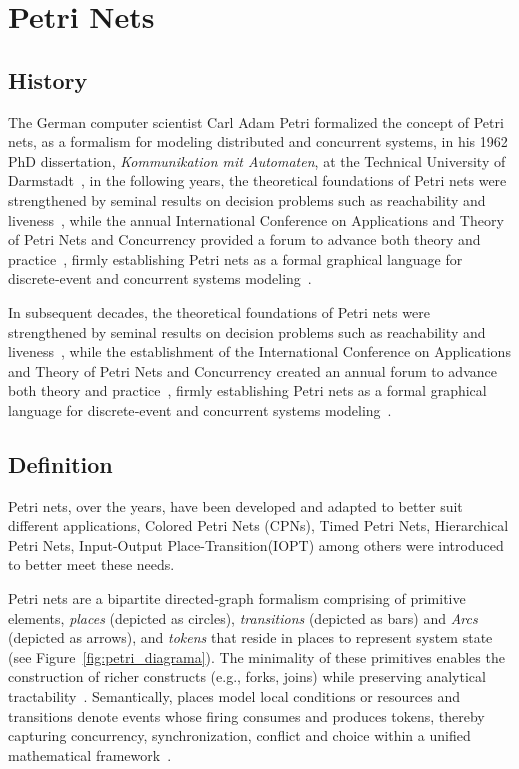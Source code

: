 \section{Petri Nets}
\label{sec:petri_nets}


\subsection{History}
\label{subsec:history}
The German computer scientist Carl Adam Petri formalized the concept of  Petri nets, as a formalism for modeling distributed and concurrent systems, in his 1962 PhD dissertation, \emph{Kommunikation mit Automaten}, at the Technical University of Darmstadt~\cite{adamCarlPetri}, in the following years, the theoretical foundations of Petri nets were strengthened by seminal results on decision problems such as reachability and liveness~\cite{murata}, while the annual International Conference on Applications and Theory of Petri Nets and Concurrency provided a forum to advance both theory and practice~\cite{ICPN1980}, firmly establishing Petri nets as a formal graphical language for discrete‐event and concurrent systems modeling~\cite{WikiPetriNet2025}.


In subsequent decades, the theoretical foundations of Petri nets were strengthened by seminal results on decision problems such as reachability and liveness~\cite{murata}, while the establishment of the International Conference on Applications and Theory of Petri Nets and Concurrency created an annual forum to advance both theory and practice~\cite{ICPN1980}, firmly establishing Petri nets as a formal graphical language for discrete‐event and concurrent systems modeling~\cite{WikiPetriNet2025}.

\subsection{Definition}
\label{subsec:definition}


Petri nets, over the years, have been developed and adapted to better suit different applications,  Colored Petri Nets (CPNs), Timed Petri Nets, Hierarchical Petri Nets, Input-Output Place-Transition(IOPT) among others were introduced to better meet these needs. 

Petri nets are a bipartite directed‐graph formalism comprising of primitive elements, \emph{places} (depicted as circles), \emph{transitions} (depicted as bars) and \emph{Arcs} (depicted as arrows), and \emph{tokens} that reside in places to represent system state (see Figure~\ref{fig:petri_diagrama}). The minimality of these primitives enables the construction of richer constructs (e.g., forks, joins) while preserving analytical tractability~\cite{50-years}. Semantically, places model local conditions or resources and transitions denote events whose firing consumes and produces tokens, thereby capturing concurrency, synchronization, conflict and choice within a unified mathematical framework~\cite{50-years}. 


